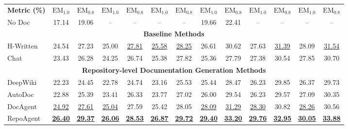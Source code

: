 \begin{table}[t]
\begin{tabular}{l|cc|cc|cc|cc|cc|cc}
\rowcolor{mypink} \multicolumn{13}{c}{\textbf{Functionality Completion}} \\ \midrule
\rowcolor{gray!20} \textbf{Metric (\%)} & $\text{EM}_{1.0}$ & $\text{EM}_{0.8}$ & $\text{EM}_{1.0}$ & $\text{EM}_{0.8}$ & $\text{EM}_{1.0}$ & $\text{EM}_{0.8}$ & $\text{EM}_{1.0}$ & $\text{EM}_{0.8}$ & $\text{EM}_{1.0}$ & $\text{EM}_{0.8}$ & $\text{EM}_{1.0}$ & $\text{EM}_{0.8}$ \\
\midrule
No Doc      & 17.14 & 19.06 & -- & -- & -- & -- & 19.66 & 22.41 & -- & -- & -- & -- \\ \midrule
 \multicolumn{13}{c}{\textbf{Baseline Methods}} \\ \midrule
H-Written  & 24.54 & 27.23 & 25.00 & \underline{27.81} & \underline{25.58} & \underline{28.25} & 26.61 & 30.62 & 27.63 & \underline{31.39} & 28.09 & \underline{31.54} \\
Chat     & 23.43 & 26.28 & 24.25 & 26.74 & 25.38 & 27.82 & 25.36 & 27.79 & 27.38 & 30.54 & 27.85 & 30.70 \\
\midrule
 \multicolumn{13}{c}{\textbf{Repository-level Documentation Generation Methods}} \\ \midrule
DeepWiki & 22.23 & 24.45 & 22.78 & 24.74 & 23.16 & 25.53 & 25.44 & 28.47 & 26.23 & 29.85 & 26.37 & 29.73 \\
AutoDoc  & 22.88 & 25.39 & 23.41 & 26.33 & 23.77 & 27.02 & 26.00 & 29.54 & 26.23 & 29.57 & 27.09 & 30.35 \\
DocAgent & \underline{24.92} & \underline{27.61} & \underline{25.04} & 27.59 & 25.42 & 28.05 & \underline{28.09} & \underline{31.29} & \underline{28.30} & 30.82 & \underline{28.26} & 30.56 \\
RepoAgent & \underline{\textbf{26.40}} & \underline{\textbf{29.37}} & \underline{\textbf{26.06}} & \underline{\textbf{28.53}} & \underline{\textbf{26.87}} & \underline{\textbf{29.72}} & \underline{\textbf{29.40}} & \underline{\textbf{33.20}} & \underline{\textbf{29.76}} & \underline{\textbf{32.95}} & \underline{\textbf{30.05}} & \underline{\textbf{33.88}} \\

\bottomrule
\end{tabular}
\vspace{-1em}
\end{table}

